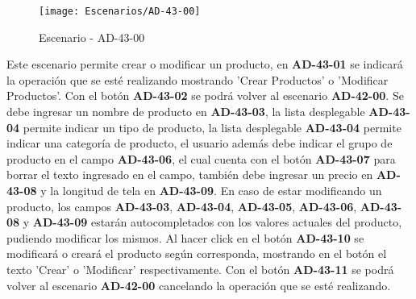 \begin{figure}[H]
\centering
\texttt{[image: Escenarios/AD-43-00]}
\caption{Escenario - AD-43-00}
\label{fig:AD-43-00}
\end{figure}

Este escenario permite crear o modificar un producto, en \textbf{AD-43-01} se indicará la operación que se esté realizando mostrando 'Crear Productos' o 'Modificar Productos'. Con el botón \textbf{AD-43-02} se podrá volver al escenario \textbf{AD-42-00}. Se debe ingresar un nombre de producto en \textbf{AD-43-03}, la lista desplegable \textbf{AD-43-04} permite indicar un tipo de producto, la lista desplegable \textbf{AD-43-04} permite indicar una categoría de producto, el usuario además debe indicar el grupo de producto en el campo \textbf{AD-43-06}, el cual cuenta con el botón \textbf{AD-43-07} para borrar el texto ingresado en el campo, también debe ingresar un precio en \textbf{AD-43-08} y la longitud de tela en \textbf{AD-43-09}. En caso de estar modificando un producto, los campos \textbf{AD-43-03}, \textbf{AD-43-04}, \textbf{AD-43-05}, \textbf{AD-43-06}, \textbf{AD-43-08} y \textbf{AD-43-09} estarán autocompletados con los valores actuales del producto, pudiendo modificar los mismos. Al hacer click en el botón \textbf{AD-43-10} se modificará o creará el producto según corresponda, mostrando en el botón el texto 'Crear' o 'Modificar' respectivamente. Con el botón \textbf{AD-43-11} se podrá volver al escenario \textbf{AD-42-00} cancelando la operación que se esté realizando.
\clearpage
